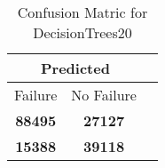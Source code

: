 \begin{table}[] 
\caption{Confusion Matric for DecisionTrees20} 
\label{Table: Prediction Accuracy-DMDDecisionTrees20OnlySunEKF-combinationReflectionEKF-top2-Reflection} 
\centering 
\begin{tabular} 
 {@{}ccc@{}} 
\toprule 
\multicolumn{2}{c}{\textbf{Predicted}}
 \\ \midrule 
\multicolumn{1}{|c|}{Failure} & 
\multicolumn{1}{c|}{No Failure}
 \\ \midrule 
\multicolumn{1}{|c|}{\color{green}\textbf{88495}} & 
\multicolumn{1}{c|}{\color{red}\textbf{27127}}
 \\ \midrule 
\multicolumn{1}{|c|}{\color{red}\textbf{15388}} & 
\multicolumn{1}{c|}{\color{green}\textbf{39118}}
 \\ \bottomrule 
\end{tabular} 
\end{table} 
